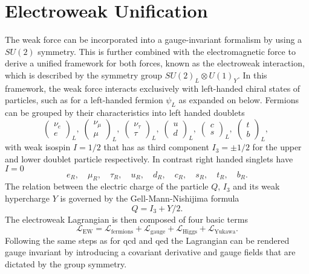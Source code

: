 \section{Electroweak Unification}\label{sec:ew}
The weak force can be incorporated into a gauge-invariant formalism by using a $SU(2)$ symmetry. This is further combined with the electromagnetic force to derive a unified framework for both forces, known as the electroweak interaction, which is described by the symmetry group $SU(2)_L \otimes U(1)_Y$. In this framework, the weak force interacts exclusively with left-handed chiral states of particles, such as for a left-handed fermion $\psi_L$ as expanded on below. Fermions can be grouped by their characteristics into left handed doublets
\begin{equation}
    \begin{pmatrix}
        \nu_e \\ e
    \end{pmatrix}_L, \;
    \begin{pmatrix}
        \nu_\mu \\ \mu
    \end{pmatrix}_L, \;
    \begin{pmatrix}
        \nu_\tau \\ \tau
    \end{pmatrix}_L, \;
    \begin{pmatrix}
        u \\ d
    \end{pmatrix}_L, \;
    \begin{pmatrix}
        c \\ s
    \end{pmatrix}_L, \;
    \begin{pmatrix}
        t \\ b
    \end{pmatrix}_L, \;
    \label{eq:weak_doublets}
\end{equation}
with weak isospin $I=1/2$ that has as third component $I_3=\pm1/2$ for the upper and lower doublet particle respectively. In contrast right handed singlets have $I=0$
\begin{equation}
    e_R    ,\quad \mu_R ,\quad    \tau_R ,\quad    u_R,\quad d_R ,\quad    c_R ,\quad s_R ,\quad    t_R ,\quad b_R.
    \label{eq:weak_singlets}
\end{equation}
The relation between the electric charge of the particle $Q$, $I_3$ and its weak hypercharge $Y$ is governed by the Gell-Mann-Nishijima formula
\begin{equation}
    Q=I_3+Y/2.
    \label{eq:gellmann_nishijima_formula}
\end{equation}
The electroweak Lagrangian is then composed of four basic terms
\begin{equation}
    \mathcal{L}_\mathrm{EW} = \mathcal{L}_\mathrm{fermions}+\mathcal{L}_\mathrm{gauge}+\mathcal{L}_\mathrm{Higgs}+\mathcal{L}_\mathrm{Yukawa}.
    \label{eq:L_EW}
\end{equation}
Following the same steps as for \ac{qcd} and \ac{qed} the Lagrangian can be rendered gauge invariant by introducing a covariant derivative and gauge fields that are dictated by the group symmetry.

